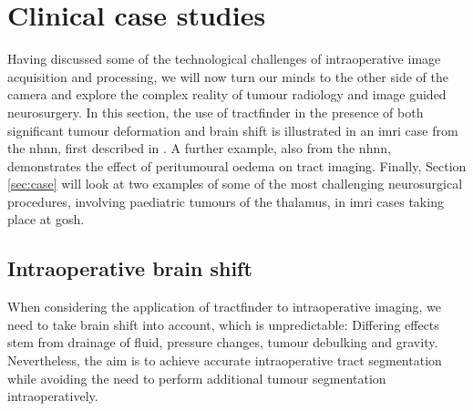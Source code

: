 \section{Clinical case studies}

Having discussed some of the technological challenges of intraoperative image acquisition and processing, we will now turn our minds to the other side of the camera and explore the complex reality of tumour radiology and image guided neurosurgery.
In this section, the use of tractfinder in the presence of both significant tumour deformation and brain shift is illustrated in an \gls{imri} case from the \gls{nhnn}, first described in \textcite{Young2022}.
A further example, also from the \gls{nhnn}, demonstrates the effect of peritumoural oedema on tract imaging.
Finally, Section \ref{sec:case} will look at two examples of some of the most challenging neurosurgical procedures, involving paediatric tumours of the thalamus, in \gls{imri} cases taking place at \gls{gosh}.

\subsection{Intraoperative brain shift}
\label{sec:imri}

When considering the application of tractfinder to intraoperative imaging, we need to take brain shift into account, which is unpredictable:
Differing effects stem from drainage of fluid, pressure changes, tumour debulking and gravity.
Nevertheless, the aim is to achieve accurate intraoperative tract segmentation while avoiding the need to perform additional tumour segmentation intraoperatively.

